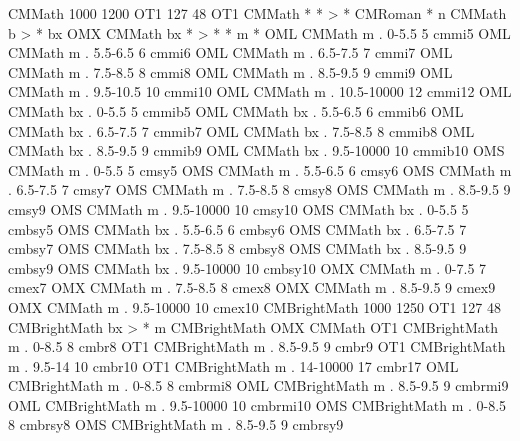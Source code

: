 \let\@cm@leftarrowfill\leftarrowfill
%
%
\declaremathfontfamily CMMath 1000 1200 OT1 127 48
\fontmap OT1 CMMath * * > * CMRoman * n
\fontmapseries CMMath b > * bx
\fontmap OMX CMMath bx * > * * m *
\declarefont OML CMMath m   .  0-5.5      5  cmmi5
\declarefont OML CMMath m   .  5.5-6.5    6  cmmi6
\declarefont OML CMMath m   .  6.5-7.5    7  cmmi7
\declarefont OML CMMath m   .  7.5-8.5    8  cmmi8
\declarefont OML CMMath m   .  8.5-9.5    9  cmmi9
\declarefont OML CMMath m   .  9.5-10.5   10 cmmi10
\declarefont OML CMMath m   .  10.5-10000 12 cmmi12
%
\declarefont OML CMMath bx  .  0-5.5      5  cmmib5
\declarefont OML CMMath bx  .  5.5-6.5    6  cmmib6
\declarefont OML CMMath bx  .  6.5-7.5    7  cmmib7
\declarefont OML CMMath bx  .  7.5-8.5    8  cmmib8
\declarefont OML CMMath bx  .  8.5-9.5    9  cmmib9
\declarefont OML CMMath bx  .  9.5-10000  10 cmmib10
%
\declarefont OMS CMMath m   .  0-5.5      5  cmsy5
\declarefont OMS CMMath m   .  5.5-6.5    6  cmsy6
\declarefont OMS CMMath m   .  6.5-7.5    7  cmsy7
\declarefont OMS CMMath m   .  7.5-8.5    8  cmsy8
\declarefont OMS CMMath m   .  8.5-9.5    9  cmsy9
\declarefont OMS CMMath m   .  9.5-10000  10 cmsy10
\declarefont OMS CMMath bx  .  0-5.5      5  cmbsy5
\declarefont OMS CMMath bx  .  5.5-6.5    6  cmbsy6
\declarefont OMS CMMath bx  .  6.5-7.5    7  cmbsy7
\declarefont OMS CMMath bx  .  7.5-8.5    8  cmbsy8
\declarefont OMS CMMath bx  .  8.5-9.5    9  cmbsy9
\declarefont OMS CMMath bx  .  9.5-10000  10 cmbsy10
%
\declarefont OMX CMMath m   .  0-7.5      7  cmex7
\declarefont OMX CMMath m   .  7.5-8.5    8  cmex8
\declarefont OMX CMMath m   .  8.5-9.5    9  cmex9
\declarefont OMX CMMath m   .  9.5-10000  10 cmex10
%
%
\declaremathfontfamily CMBrightMath 1000 1250 OT1 127 48
\fontmapseries CMBrightMath bx > * m
\fontmapfamily CMBrightMath OMX CMMath
\declarefont OT1 CMBrightMath m . 0-8.5     8  cmbr8
\declarefont OT1 CMBrightMath m . 8.5-9.5   9  cmbr9
\declarefont OT1 CMBrightMath m . 9.5-14    10 cmbr10
\declarefont OT1 CMBrightMath m . 14-10000  17 cmbr17
\declarefont OML CMBrightMath m . 0-8.5     8  cmbrmi8
\declarefont OML CMBrightMath m . 8.5-9.5   9  cmbrmi9
\declarefont OML CMBrightMath m . 9.5-10000 10 cmbrmi10
\declarefont OMS CMBrightMath m . 0-8.5     8  cmbrsy8
\declarefont OMS CMBrightMath m . 8.5-9.5   9  cmbrsy9
